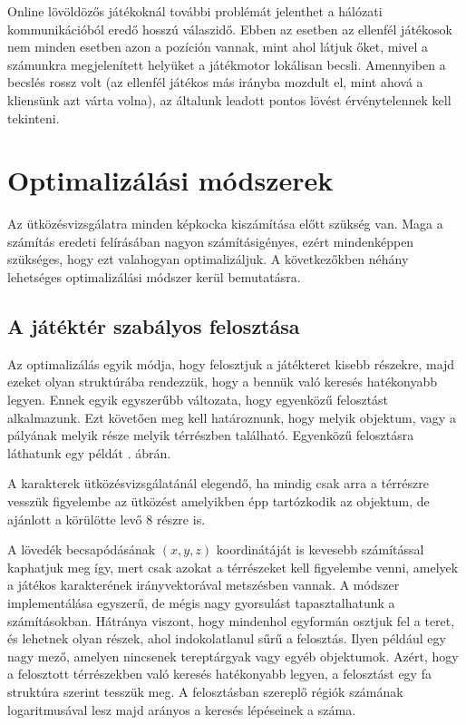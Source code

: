 Online lövöldözős játékoknál további problémát jelenthet a hálózati kommunikációból eredő hosszú válaszidő. Ebben az esetben az ellenfél játékosok nem minden esetben azon a pozíción vannak, mint ahol látjuk őket, mivel a számunkra megjelenített helyüket a játékmotor lokálisan becsli. Amennyiben a becslés rossz volt (az ellenfél játékos más irányba mozdult el, mint ahová a kliensünk azt várta volna), az általunk leadott pontos lövést érvénytelennek kell tekinteni.

\section{Optimalizálási módszerek}

Az ütközésvizsgálatra minden képkocka kiszámítása előtt szükség van. Maga a számítás eredeti felírásában nagyon számításigényes, ezért mindenképpen szükséges, hogy ezt valahogyan optimalizáljuk. A következőkben néhány lehetséges optimalizálási módszer kerül bemutatásra.

\subsection{A játéktér szabályos felosztása}

Az optimalizálás egyik módja, hogy felosztjuk a játékteret kisebb részekre, majd ezeket olyan struktúrába rendezzük, hogy a bennük való keresés hatékonyabb legyen. Ennek egyik egyszerűbb változata, hogy egyenközű felosztást alkalmazunk. Ezt követően meg kell határoznunk, hogy melyik objektum, vagy a pályának melyik része melyik térrészben található. Egyenközű felosztásra láthatunk egy példát . ábrán.

A karakterek ütközésvizsgálatánál elegendő, ha mindig csak arra a térrészre vesszük figyelembe az ütközést amelyikben épp tartózkodik az objektum, de ajánlott a körülötte levő 8 részre is.

A lövedék becsapódásának $(x, y, z)$ koordinátáját is kevesebb számítással kaphatjuk meg így, mert csak azokat a térrészeket kell figyelembe venni, amelyek a játékos karakterének irányvektorával metszésben vannak. A módszer implementálása egyszerű, de mégis nagy gyorsulást tapasztalhatunk a számításokban. Hátránya viszont, hogy mindenhol egyformán osztjuk fel a teret, és lehetnek olyan részek, ahol indokolatlanul sűrű a felosztás. Ilyen például egy nagy mező, amelyen nincsenek tereptárgyak vagy egyéb objektumok. Azért, hogy a felosztott térrészekben való keresés hatékonyabb legyen, a felosztást egy fa struktúra szerint tesszük meg. A felosztásban szereplő régiók számának logaritmusával lesz majd arányos a keresés lépéseinek a száma.


